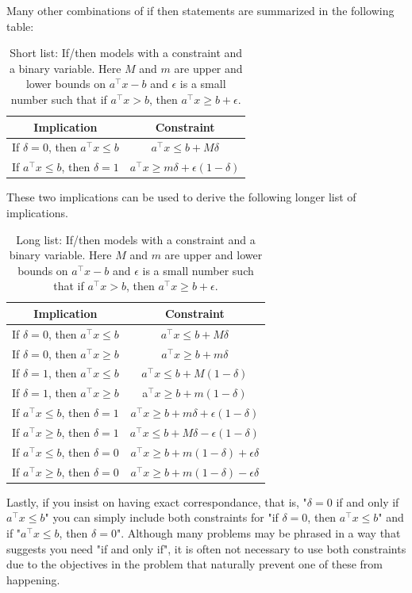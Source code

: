 Many other combinations of if then statements are summarized in the following table:
\begin{table}
\begin{center}
\begin{tabular}{|c|c|}
\hline
\textbf{Implication} & \textbf{Constraint}\\
\hline
If $\delta = 0$, then $a^\top x \leq b$ & $a^\top x \leq b + M \delta$\\
If $a^\top x \leq b$, then $\delta = 1$ & $a^\top x \geq m \delta + \epsilon(1-\delta)$\\
\hline
\end{tabular}
\end{center}
\caption{Short list: If/then models with a constraint and a binary variable.  Here $M$ and $m$ are upper and lower bounds on $a^\top x - b$ and $\epsilon$ is a small number such that if $a^\top x > b$, then $a^\top x \geq b + \epsilon$.}
\end{table}
These two implications can be used to derive the following longer list of implications.

\begin{table}
\begin{center}
\begin{tabular}{|c|c|}
\hline
\textbf{Implication} & \textbf{Constraint}\\
\hline
If $\delta = 0$, then $a^\top x \leq b$ & $a^\top x \leq b + M \delta$\\
If $\delta = 0$, then $a^\top x \geq b$ & $a^\top x \geq b + m \delta$\\
If $\delta = 1$, then $a^\top x \leq b$ & $a^\top x \leq b + M (1-\delta)$\\
If $\delta = 1$, then $a^\top x \geq b$ & a$^\top x \geq b + m (1-\delta)$\\
If $a^\top x \leq b$, then $\delta = 1$ & $a^\top x \geq b + m \delta + \epsilon(1-\delta)$\\
If $a^\top x \geq b$, then $\delta = 1$ & $a^\top x \leq b + M \delta - \epsilon(1-\delta)$\\
If $a^\top x \leq b$, then $\delta = 0$ & $a^\top x \geq b + m (1-\delta) + \epsilon \delta$\\
If $a^\top x \geq b$, then $\delta = 0$ & $a^\top x \geq b + m (1-\delta) - \epsilon \delta$\\
\hline
\end{tabular}
\end{center}
\caption{Long list: If/then models with a constraint and a binary variable.  Here $M$ and $m$ are upper and lower bounds on $a^\top x - b$ and $\epsilon$ is a small number such that if $a^\top x > b$, then $a^\top x \geq b + \epsilon$.}
\end{table}
Lastly, if you insist on having exact correspondance, that is, "$\delta = 0 $ if and only if $a^\top x \leq b$" you can simply include both constraints for "if $\delta = 0 $, then $a^\top x \leq b$" and if "$a^\top x \leq b$, then $\delta = 0 $".  Although many problems may be phrased in a way that suggests you need "if and only if", it is often not necessary to use both constraints due to the objectives in the problem that naturally prevent one of these from happening.  

